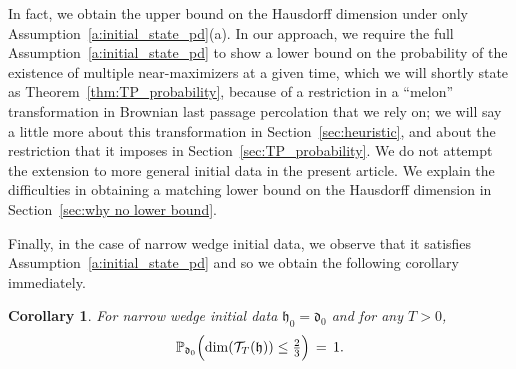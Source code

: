 \documentclass[oneside,final,11pt]{amsart}
\newtheorem{cor}[thm]{Corollary}
\theoremstyle{definition}
\newcommand{\fh}{\mathfrak{h}}
\newcommand{\fd}{\mathfrak{d}}
\newcommand{\CT}{\mathcal{T}}
\newcommand{\1}[1]{\mathbf{1}_{#1}}
\newcommand{\blue}[1]{{\color{blue}#1}}
\newcommand{\kmtext}[1]{{\color{red}[KM:#1]}}
\renewcommand{\P}{\mathbb P}
\let\emptyset\varnothing
\numberwithin{equation}{section}
\begin{document}

In fact, we obtain the upper bound on the Hausdorff dimension under only Assumption~\ref{a:initial_state_pd}(a). In our approach, we require the full Assumption~\ref{a:initial_state_pd} to show a lower bound on the probability of the existence of multiple near-maximizers at a given time, which we will shortly state as Theorem~\ref{thm:TP_probability}, because of a restriction in a ``melon'' transformation in Brownian last passage percolation that we rely on; we will say a little more about this transformation in Section~\ref{sec:heuristic}, and about the restriction that it imposes in Section~\ref{sec:TP_probability}. We do not attempt the extension to more general initial data in the present article. We explain the difficulties in obtaining a matching lower bound on the Hausdorff dimension in Section~\ref{sec:why no lower bound}.



Finally, in the case of narrow wedge initial data, we observe that it satisfies Assumption~\ref{a:initial_state_pd} and so we obtain the following corollary immediately. %


\begin{cor}\label{cor:nw}
For narrow wedge initial data $\fh_0=\fd_0$ and for any $T>0$, %
\begin{equation}\label{eq:dimTPNW}
\P_{\fd_0}\Bigl(\dim(\CT_{T}(\fh)) \leq \tfrac{2}{3} \Bigr) \, = \, 1.
\end{equation}
\end{cor}
\end{document}
